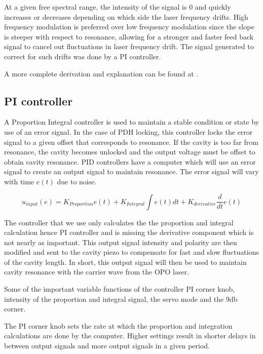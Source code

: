 \documentclass[11pt,a4paper]{book}
\begin{document}
		At a given free spectral  range, the intensity of the signal is 0 and quickly increases or decreases depending on which side the laser frequency drifts. 
		High frequency modulation is preferred over low frequency modulation since the slope is steeper with respect to resonance, allowing for a stronger and faster feed back signal to cancel out fluctuations in laser frequency drift. The signal generated to correct for such drifts was done by a PI controller.
		
		A more complete derivation and explanation can be found at \cite{PDH Intro}.
		
		\subsection{PI controller}
			\label{subsec:PI controller}
			A Proportion Integral controller is used to maintain a stable condition or state by use of an error signal. In the case of PDH locking, this controller locks the error signal to a given offset that corresponds to resonance. If the cavity is too far from resonance, the cavity becomes unlocked and the output voltage must be offset to obtain cavity resonance.
			PID controllers have a computer which will use an error signal to create an output signal to maintain resonance. The error signal will vary with time $e(t)$ due to noise.
			
			\begin{equation}
				u_{input}(e)=K_{Proportion}e(t)+K_{Integral} \int{e(t)dt} +K_{derivative} \frac{d}{dt}e(t)
			\end{equation}
			
			The controller that we use only calculates the the proportion and integral calculation hence PI controller and is missing the derivative component which is not nearly as important.
			This output signal intensity and polarity are then modified and sent to the cavity piezo to compensate for fast and slow fluctuations of the cavity length. In short, this output signal will then be used to maintain cavity resonance with the carrier wave from the OPO laser. 
			
			Some of the important variable functions of the controller PI corner knob, intensity of the proportion and integral signal, the servo mode and the 9db corner. 
			
			The PI corner knob sets the rate at which the proportion and integration calculations are done by the computer. Higher settings result in shorter delays in between output signals and more output signals in a given period. 
			
\end{document}
